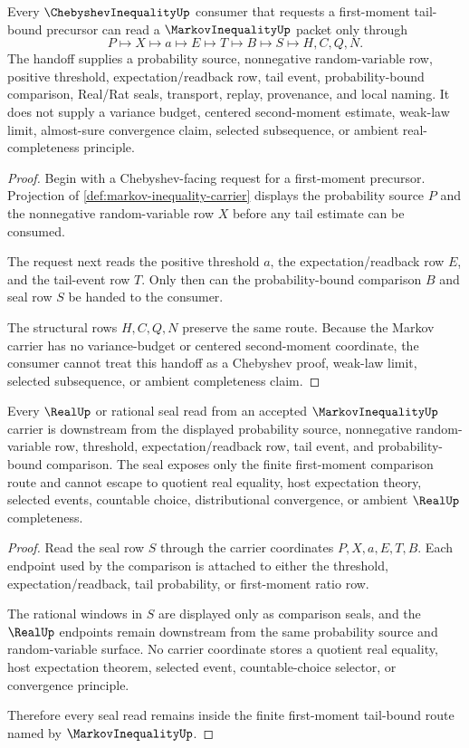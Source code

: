 \begin{theorem}\label{thm:markov-inequality-chebyshev-handoff}
Every $\ChebyshevInequalityUp$ consumer that requests a first-moment tail-bound precursor can read a $\MarkovInequalityUp$ packet only through
$$
P\longmapsto X\longmapsto a\longmapsto E\longmapsto T\longmapsto B\longmapsto S\longmapsto H,C,Q,N.
$$
The handoff supplies a probability source, nonnegative random-variable row, positive threshold, expectation/readback row, tail event, probability-bound comparison, Real/Rat seals, transport, replay, provenance, and local naming. It does not supply a variance budget, centered second-moment estimate, weak-law limit, almost-sure convergence claim, selected subsequence, or ambient real-completeness principle.
\end{theorem}
\begin{proof}
Begin with a Chebyshev-facing request for a first-moment precursor. Projection of \autoref{def:markov-inequality-carrier} displays the probability source $P$ and the nonnegative random-variable row $X$ before any tail estimate can be consumed.

The request next reads the positive threshold $a$, the expectation/readback row $E$, and the tail-event row $T$. Only then can the probability-bound comparison $B$ and seal row $S$ be handed to the consumer.

The structural rows $H,C,Q,N$ preserve the same route. Because the Markov carrier has no variance-budget or centered second-moment coordinate, the consumer cannot treat this handoff as a Chebyshev proof, weak-law limit, selected subsequence, or ambient completeness claim.
\end{proof}

\begin{theorem}\label{thm:markov-inequality-real-seal-nonescape}
Every $\RealUp$ or rational seal read from an accepted $\MarkovInequalityUp$ carrier is downstream from the displayed probability source, nonnegative random-variable row, threshold, expectation/readback row, tail event, and probability-bound comparison. The seal exposes only the finite first-moment comparison route and cannot escape to quotient real equality, host expectation theory, selected events, countable choice, distributional convergence, or ambient $\RealUp$ completeness.
\end{theorem}
\begin{proof}
Read the seal row $S$ through the carrier coordinates $P,X,a,E,T,B$. Each endpoint used by the comparison is attached to either the threshold, expectation/readback, tail probability, or first-moment ratio row.

The rational windows in $S$ are displayed only as comparison seals, and the $\RealUp$ endpoints remain downstream from the same probability source and random-variable surface. No carrier coordinate stores a quotient real equality, host expectation theorem, selected event, countable-choice selector, or convergence principle.

Therefore every seal read remains inside the finite first-moment tail-bound route named by $\MarkovInequalityUp$.
\end{proof}

